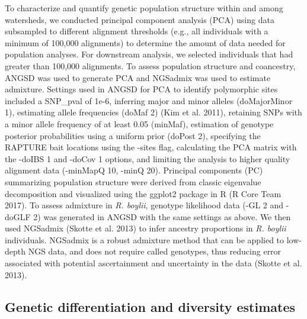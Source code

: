 \documentclass[twoside,12pt,final]{ucthesis-CA2012} %
\begin{document}
\begin{ucmainmatter}
To characterize and quantify genetic population structure within and
among watersheds, we conducted principal component analysis (PCA) using
data subsampled to different alignment thresholds (e.g., all individuals
with a minimum of 100,000 alignments) to determine the amount of data
needed for population analyses. For downstream analysis, we selected
individuals that had greater than 100,000 alignments. To assess
population structure and coancestry, ANGSD was used to generate PCA and
NGSadmix was used to estimate admixture. Settings used in ANGSD for PCA
to identify polymorphic sites included a SNP\_pval of 1e-6, inferring
major and minor alleles (doMajorMinor 1), estimating allele frequencies
(doMaf 2) (Kim et al. 2011), retaining SNPs with a minor allele
frequency of at least 0.05 (minMaf), estimation of genotype posterior
probabilities using a uniform prior (doPost 2), specifying the RAPTURE
bait locations using the -sites flag, calculating the PCA matrix with
the -doIBS 1 and -doCov 1 options, and limiting the analysis to higher
quality alignment data (-minMapQ 10, -minQ 20). Principal components
(PC) summarizing population structure were derived from classic
eigenvalue decomposition and visualized using the ggplot2 package in R
(R Core Team 2017). To assess admixture in \emph{R. boylii}, genotype
likelihood data (-GL 2 and -doGLF 2) was generated in ANGSD with the
same settings as above. We then used NGSadmix (Skotte et al. 2013) to
infer ancestry proportions in \emph{R. boylii} individuals. NGSadmix is
a robust admixture method that can be applied to low-depth NGS data, and
does not require called genotypes, thus reducing error associated with
potential ascertainment and uncertainty in the data (Skotte et al.
2013).

\hypertarget{genetic-differentiation-and-diversity-estimates-1}{%
\subsection{Genetic differentiation and diversity
estimates}\label{genetic-differentiation-and-diversity-estimates-1}}


\end{ucmainmatter}
\end{document}
